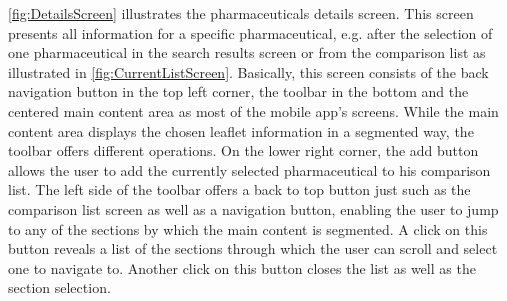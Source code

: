 \ref{fig:DetailsScreen} illustrates the pharmaceuticals details screen. This screen presents all information for a specific pharmaceutical, e.g. after the selection of one pharmaceutical in the search results screen or from the comparison list as illustrated in \ref{fig:CurrentListScreen}. Basically, this screen consists of the back navigation button in the top left corner, the toolbar in the bottom and the centered main content area as most of the mobile app's screens. While the main content area displays the chosen leaflet information in a segmented way, the toolbar offers different operations. On the lower right corner, the add button allows the user to add the currently selected pharmaceutical to his comparison list. The left side of the toolbar offers a back to top button just such as the comparison list screen as well as a navigation button, enabling the user to jump to any of the sections by which the main content is segmented. A click on this button reveals a list of the sections through which the user can scroll and select one to navigate to. Another click on this button closes the list as well as the section selection.

